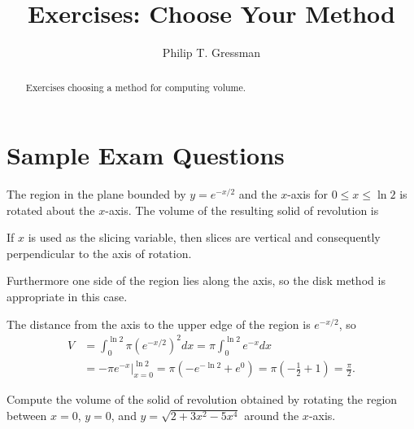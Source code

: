 \documentclass{ximera}
\title{Exercises: Choose Your Method}
\author{Philip T. Gressman}
\begin{document}
\begin{abstract}
Exercises choosing a method for computing volume.
\end{abstract}
\maketitle

\section*{Sample Exam Questions}

\begin{question}%
The region in the plane bounded by $y = e^{-x/2}$ and the $x$-axis for $0 \leq x \leq \ln 2$ is rotated about the $x$-axis. The volume of the resulting solid of revolution is
\begin{multiplechoice}
\choice{\(\displaystyle 2 \pi\)}
\end{multiplechoice}
\begin{feedback}
If $x$ is used as the slicing variable, then slices are vertical and consequently perpendicular to the axis of rotation. \begin{hint}
Furthermore one side of the region lies along the axis, so the disk method is appropriate in this case. 
\begin{hint}
The distance from the axis to the upper edge of the region is $e^{-x/2}$, so
\[ \begin{aligned} V & = \int_0^{\ln 2} \pi \left( e^{-x/2} \right)^2 dx = \pi \int_0^{\ln 2} e^{-x} dx \\ & =  \left. - \pi e^{-x} \right|_{x=0}^{\ln 2} = \pi (-e^{-\ln 2} + e^0) = \pi \left( - \frac{1}{2} + 1 \right) = \frac{\pi}{2}. \end{aligned}\]
\end{hint}
\end{hint}
\end{feedback}

\end{question}

\begin{question}%
Compute the volume of the solid of revolution obtained by rotating the region between $x=0$, $y=0$, and $y=\sqrt{2+3x^2 - 5x^4}$ around the $x$-axis.
\begin{multiplechoice} 
\choice{\(\displaystyle - \pi\)}
\choice{\(\displaystyle \pi\)}
\choice[correct]{\(\displaystyle 2 \pi\)}
\choice{\(\displaystyle 3 \pi\)}
\choice{\(\displaystyle 4 \pi\)}
\end{multiplechoice}

\end{question}
\end{document}
